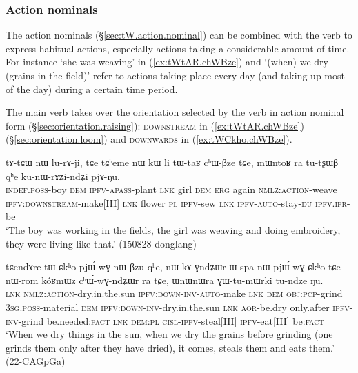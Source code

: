 \subsubsection{Action nominals} \label{sec:action.nominal.Bzu}
The  action nominals (§\ref{sec:tW.action.nominal}) can be combined with the verb  to express habitual actions, especially actions taking a considerable amount of time. For instance  `she was weaving' in (\ref{ex:tWtAR.chWBze}) and  `(when) we dry (grains in the field)' refer to actions taking place every day (and taking up most of the day) during a certain time period.  

The main verb  takes over the orientation selected by the verb in action nominal form (§\ref{sec:orientation.raising}): \textsc{downstream} in (\ref{ex:tWtAR.chWBze}) (§\ref{sec:orientation.loom}) and \textsc{downwards} in (\ref{ex:tWCkho.chWBze}).

\begin{exe}
	\ex \label{ex:tWtAR.chWBze}
	\gll tɤ-tɕɯ nɯ lu-rɤ-ji,  tɕe tɕʰeme nɯ kɯ li tɯ-taʁ cʰɯ-βze tɕe, mɯntoʁ ra tu-tʂɯβ qʰe ku-nɯ-rɤʑi-ndʑi pjɤ-ŋu.  \\
	\textsc{indef}.\textsc{poss}-boy \textsc{dem} \textsc{ipfv}-\textsc{apass}-plant \textsc{lnk} girl \textsc{dem} \textsc{erg} again \textsc{nmlz}:\textsc{action}-weave \textsc{ipfv}:\textsc{downstream}-make[III] \textsc{lnk} flower \textsc{pl} \textsc{ipfv}-sew \textsc{lnk} \textsc{ipfv}-\textsc{auto}-stay-\textsc{du} \textsc{ipfv}.\textsc{ifr}-be \\
	\glt `The boy was working in the fields, the girl was weaving and doing embroidery, they were living like that.' (150828 donglang)
\end{exe}


\begin{exe}
	\ex \label{ex:tWCkho.chWBze}
	\gll tɕendɤre tɯ-ɕkʰo pjɯ́-wɣ-nɯ-βzu qʰe, nɯ kɤ-ɣndʑɯr ɯ-spa nɯ pjɯ́-wɣ-ɕkʰo tɕe nɯ-rom kóʁmɯz cʰɯ́-wɣ-ndʑɯr ra tɕe, ɯnɯnɯra ɣɯ-tu-mɯrki tu-ndze ŋu. \\
	\textsc{lnk} \textsc{nmlz}:\textsc{action}-dry.in.the.sun \textsc{ipfv}:\textsc{down}-\textsc{inv}-\textsc{auto}-make \textsc{lnk} \textsc{dem} \textsc{obj}:\textsc{pcp}-grind \textsc{3sg}.\textsc{poss}-material \textsc{dem} \textsc{ipfv}:\textsc{down}-\textsc{inv}-dry.in.the.sun \textsc{lnk} \textsc{aor}-be.dry only.after \textsc{ipfv}-\textsc{inv}-grind be.needed:\textsc{fact} \textsc{lnk} \textsc{dem}:\textsc{pl} \textsc{cisl}-\textsc{ipfv}-steal[III] \textsc{ipfv}-eat[III] be:\textsc{fact} \\
	\glt `When we dry things in the sun, when we dry the grains before grinding (one grinds them only after they have dried), it comes, steals them and eats them.' (22-CAGpGa)
\end{exe}

